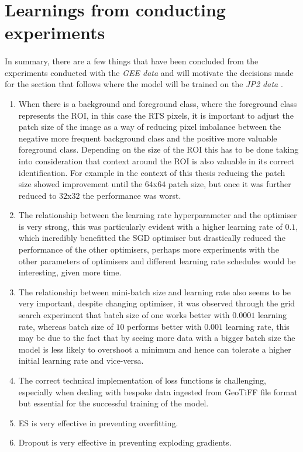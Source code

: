 \section{Learnings from conducting experiments}
\paragraph{}
In summary, there are a few things that have been concluded from the experiments conducted with the \textit{\gls{GEE} data} and will motivate the decisions made for the section that follows where the model will be trained on the \textit{\gls{JP2} data} .
\begin{enumerate}
    \item{When there is a background and foreground class, where the foreground class represents the \gls{ROI}, in this case the \gls{RTS} pixels, it is important to adjust the patch size of the image as a way of reducing pixel imbalance between the negative more frequent background class and the positive more valuable foreground class. Depending on the size of the \gls{ROI} this has to be done taking into consideration that context around the \gls{ROI} is also valuable in its correct identification. For example in the context of this thesis reducing the patch size showed improvement until the $64$x$64$ patch size, but once it was further reduced to $32$x$32$ the performance was worst.}
    \item{The relationship between the learning rate hyperparameter and the optimiser is very strong, this was particularly evident with a higher learning rate of $0.1$, which incredibly benefitted the \gls{SGD} optimiser but drastically reduced the performance of the other optimisers, perhaps more experiments with the other parameters of optimisers and different learning rate schedules would be interesting, given more time.}
    \item{The relationship between mini-batch size and learning rate also seems to be very important, despite changing optimiser, it was observed through the grid search experiment that batch size of one works better with $0.0001$ learning rate, whereas batch size of $10$ performs better with $0.001$ learning rate, this may be due to the fact that by seeing more data with a bigger batch size the model is less likely to overshoot a minimum and hence can tolerate a higher initial learning rate and vice-versa.}
    \item {The correct technical implementation of loss functions is challenging, especially when dealing with bespoke data ingested from GeoTiFF file format but essential for the successful training of the model.}
    \item {\gls{ES} is very effective in preventing overfitting.}
    \item {Dropout is very effective in preventing exploding gradients.}
\end{enumerate}
